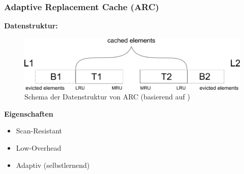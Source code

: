 \documentclass[presentation]{beamer}
\begin{document}
\begin{frame}
\frametitle{Adaptive Replacement Cache (ARC)}

\color{dd-gray} \textbf{Datenstruktur:} \color{black} 
\begin{figure}
	\includegraphics[width=0.9\linewidth]{figures/caches/arc} 
	\caption{Schema der Datenstruktur von ARC (basierend auf \cite{megiddo2003arc})}
\end{figure} 
\textbf{Eigenschaften}
\begin{itemize}
	\item Scan-Resistant %
	\item Low-Overhead
	\item Adaptiv (selbstlernend) %
\end{itemize}
\end{frame}
\end{document}
